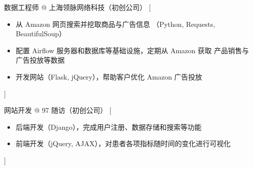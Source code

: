 \documentclass[zh]{resume}
\begin{document}
\begin{experiences}
    {数据工程师 @ 上海领脉网络科技（初创公司）}%
    [\begin{itemize}
      \item 从 Amazon 网页搜索并挖取商品与广告信息
        （Python, Requests, BeautifulSoup）
      \item 配置 Airflow 服务器和数据库等基础设施，定期从 Amazon 获取
        产品销售与广告投放等数据
      \item 开发网站（Flask, jQuery），帮助客户优化 Amazon 广告投放
    \end{itemize}]%

  \separator{0.5em}
    {网站开发 @ 97 随访（初创公司）}%
    [\begin{itemize}
      \item 后端开发（Django），完成用户注册、数据存储和搜索等功能
      \item 前端开发（jQuery, AJAX），对患者各项指标随时间的变化进行可视化
    \end{itemize}]%
\end{experiences}
\end{document}
